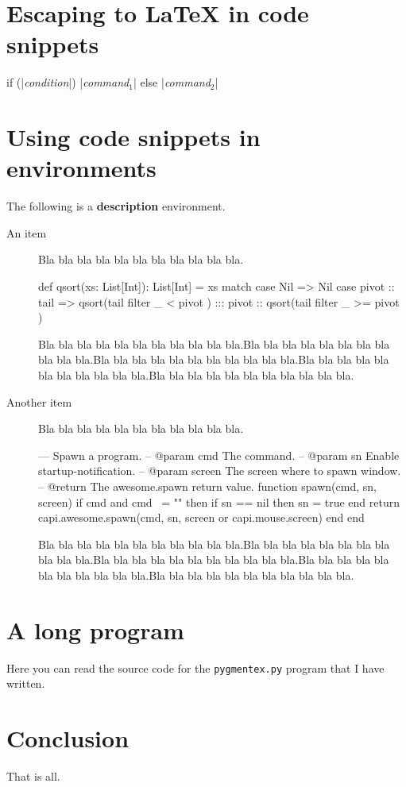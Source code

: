 \documentclass[10pt]{article}
\def\a{Bla bla bla bla bla bla bla bla bla bla bla.}
\def\b{\a\a\a\a\a}
\begin{document}
\section{Escaping to \LaTeX{} in code snippets}

\begin{pygmented}[lang=c,style=manni,escapeinside=||,
  ]
if (|\textit{condition}|)
  |\textit{command$_1$}|
else
  |\textit{command$_2$}|
\end{pygmented}


\section{Using code snippets in environments}

The following is a \textbf{description} environment.

\begin{description}
  \item[An item] \a
  \begin{pygmented}[lang=scala,colback=yellow,
    ]
def qsort(xs: List[Int]): List[Int] =
  xs match {
    case Nil =>
      Nil
    case pivot :: tail =>
      qsort(tail filter { _ < pivot }) :::
        pivot :: qsort(tail filter { _ >= pivot })
  }
  \end{pygmented}
  \b
  
  \item[Another item] \a
  \begin{pygmented}[lang=lua,colback=yellow]
--- Spawn a program.
-- @param cmd The command.
-- @param sn Enable startup-notification.
-- @param screen The screen where to spawn window.
-- @return The awesome.spawn return value.
function spawn(cmd, sn, screen)
    if cmd and cmd ~= "" then
        if sn == nil then sn = true end
        return capi.awesome.spawn(cmd, sn, screen or capi.mouse.screen)
    end
end
  \end{pygmented}
  \b
\end{description}

\section{A long program}

Here you can read the source code for the \texttt{pygmentex.py} program
that I have written.


\section{Conclusion}

That is all.
\end{document}
